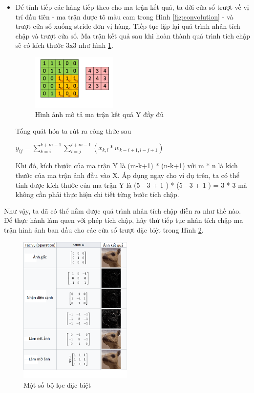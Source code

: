\documentclass[a4paper]{article}
\begin{document}
\begin{itemize}
\item Để tính tiếp các hàng tiếp theo cho ma trận kết quả, ta dời cửa sổ trượt về vị trí đầu tiên - ma trận được tô màu cam trong Hình \ref{fig:convolution} - và trượt cửa sổ xuống stride đơn vị hàng. Tiếp tục lặp lại quá trình nhân tích chập và trượt cửa sổ. Ma trận kết quả sau khi hoàn thành quá trình tích chập sẽ có kích thước 3x3 như hình \ref{fig:conv_result}.

\begin{figure}[!h]
    \centering
    \includegraphics[width=0.4\textwidth]{image/conv_result.png}
    \caption{Hình ảnh mô tả ma trận kết quả Y đầy đủ}
    \label{fig:conv_result}
\end{figure}

Tổng quát hóa ta rút ra công thức sau

$y_{ij}  = \sum_{k=i}^{k+m-1}\sum_{l=j}^{l+m-1}(x_{k,l}*w_{k-i+1,l-j+1})$

Khi đó, kích thước của ma trận Y là (m-k+1) * (n-k+1) với m * n là kích thước của ma trận ảnh đầu vào X. Áp dụng ngay cho ví dụ trên, ta có thể tính được kích thước của ma trận Y là (5 - 3 + 1 ) * (5 - 3 + 1 ) = 3 * 3 mà không cần phải thực hiện chi tiết từng bước tích chập.

\end{itemize}

Như vậy, ta đã có thể nắm được quá trình nhân tích chập diễn ra như thế nào. Để thực hành làm quen với phép tích chập, hãy thử tiếp tục nhân tích chập ma trận hình ảnh ban đầu cho các cửa sổ trượt đặc biệt trong Hình \ref{fig:filter}.

\begin{figure}[!h]
    \centering
    \includegraphics[width=0.5\textwidth]{image/filter.png}
    \caption{Một số bộ lọc đặc biệt}
    \label{fig:filter}
\end{figure}
\end{document}

